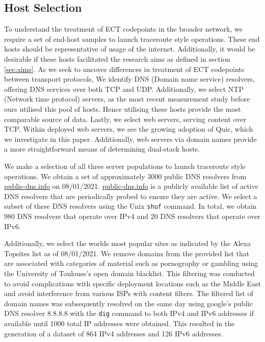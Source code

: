 \documentclass{l4proj}
\begin{document}
\subsection{Host Selection}

To understand the treatment of ECT codepoints in the broader network, we require a set of end-host samples to launch traceroute style operations. These end hosts should be representative of usage of the internet. Additionally, it would be desirable if these hosts facilitated the research aims as defined in section \ref{sec:aims}. As we seek to uncover differences in treatment of ECT codepoints between transport protocols, We identify DNS (Domain name service) resolvers, offering DNS services over both TCP and UDP.  Additionally, we select NTP (Network time protocol) servers, as the most recent measurement study before ours utilised this pool of hosts. Hence utilising these hosts provide the most comparable source of data. Lastly, we select web servers, serving content over TCP. Within deployed web servers, we see the growing adoption of Quic, which we investigate in this paper. Additionally, web servers via domain names provide a more straightforward means of determining dual-stack hosts.

We make a selection of all three server populations to launch traceroute style operations. We obtain a set of approximately 3000 public DNS resolvers from \href{https://public-dns.info}{public-dns.info} on 08/01/2021. \href{https://public-dns.info}{public-dns.info} is a publicly available list of active DNS resolvers that are periodically probed to ensure they are active. We select a subset of these DNS resolvers using the Unix \lstinline{shuf} command. In total, we obtain 980 DNS resolvers that operate over IPv4 and 20 DNS resolvers that operate over IPv6.

Additionally, we select the worlds most popular sites as indicated by the Alexa Topsites list as of 08/01/2021. We remove domains from the provided list that are associated with categories of material such as pornography or gambling using the University of Toulouse's open domain blacklist. This filtering was conducted to avoid complications with specific deployment locations such as the Middle East and avoid interference from various ISPs with content filters. The filtered list of domain names was subsequently resolved on the same day using google's public DNS resolver 8.8.8.8 with the \lstinline{dig} command to both IPv4 and IPv6 addresses if available until 1000 total IP addresses were obtained. This resulted in the generation of a dataset of 864 IPv4 addresses and 126 IPv6 addresses.
\end{document}
